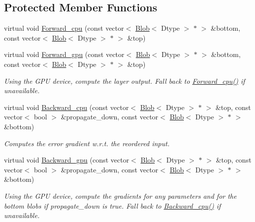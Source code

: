 \subsection*{Protected Member Functions}
\begin{DoxyCompactItemize}
\item 
virtual void \hyperlink{classcaffe_1_1BatchReindexLayer_acd40a7447f50cfa797422b457cdb739f}{Forward\+\_\+cpu} (const vector$<$ \hyperlink{classcaffe_1_1Blob}{Blob}$<$ Dtype $>$ $\ast$ $>$ \&bottom, const vector$<$ \hyperlink{classcaffe_1_1Blob}{Blob}$<$ Dtype $>$ $\ast$ $>$ \&top)
\item 
virtual void \hyperlink{classcaffe_1_1BatchReindexLayer_ac542edcc5400f3cd18b44c25ee36f784}{Forward\+\_\+gpu} (const vector$<$ \hyperlink{classcaffe_1_1Blob}{Blob}$<$ Dtype $>$ $\ast$ $>$ \&bottom, const vector$<$ \hyperlink{classcaffe_1_1Blob}{Blob}$<$ Dtype $>$ $\ast$ $>$ \&top)\hypertarget{classcaffe_1_1BatchReindexLayer_ac542edcc5400f3cd18b44c25ee36f784}{}\label{classcaffe_1_1BatchReindexLayer_ac542edcc5400f3cd18b44c25ee36f784}

\begin{DoxyCompactList}\small\item\em Using the G\+PU device, compute the layer output. Fall back to \hyperlink{classcaffe_1_1BatchReindexLayer_acd40a7447f50cfa797422b457cdb739f}{Forward\+\_\+cpu()} if unavailable. \end{DoxyCompactList}\item 
virtual void \hyperlink{classcaffe_1_1BatchReindexLayer_a6b50b080097dabed56d0cb333b07ebea}{Backward\+\_\+cpu} (const vector$<$ \hyperlink{classcaffe_1_1Blob}{Blob}$<$ Dtype $>$ $\ast$ $>$ \&top, const vector$<$ bool $>$ \&propagate\+\_\+down, const vector$<$ \hyperlink{classcaffe_1_1Blob}{Blob}$<$ Dtype $>$ $\ast$ $>$ \&bottom)
\begin{DoxyCompactList}\small\item\em Computes the error gradient w.\+r.\+t. the reordered input. \end{DoxyCompactList}\item 
virtual void \hyperlink{classcaffe_1_1BatchReindexLayer_a785a6eed33119deab1edcd3b90265318}{Backward\+\_\+gpu} (const vector$<$ \hyperlink{classcaffe_1_1Blob}{Blob}$<$ Dtype $>$ $\ast$ $>$ \&top, const vector$<$ bool $>$ \&propagate\+\_\+down, const vector$<$ \hyperlink{classcaffe_1_1Blob}{Blob}$<$ Dtype $>$ $\ast$ $>$ \&bottom)\hypertarget{classcaffe_1_1BatchReindexLayer_a785a6eed33119deab1edcd3b90265318}{}\label{classcaffe_1_1BatchReindexLayer_a785a6eed33119deab1edcd3b90265318}

\begin{DoxyCompactList}\small\item\em Using the G\+PU device, compute the gradients for any parameters and for the bottom blobs if propagate\+\_\+down is true. Fall back to \hyperlink{classcaffe_1_1BatchReindexLayer_a6b50b080097dabed56d0cb333b07ebea}{Backward\+\_\+cpu()} if unavailable. \end{DoxyCompactList}\end{DoxyCompactItemize}
